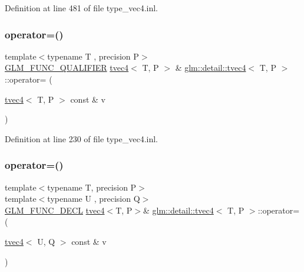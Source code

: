 Definition at line 481 of file type\+\_\+vec4.\+inl.

\mbox{\label{structglm_1_1detail_1_1tvec4_abafc0f4531b7d93b50e63bcdf9bcbf97}} 
\subsubsection{\texorpdfstring{operator=()}{operator=()}\hspace{0.1cm}{\footnotesize\ttfamily [1/3]}}
{\footnotesize\ttfamily template$<$typename T , precision P$>$ \\
\hyperlink{setup_8hpp_a33fdea6f91c5f834105f7415e2a64407}{G\+L\+M\+\_\+\+F\+U\+N\+C\+\_\+\+Q\+U\+A\+L\+I\+F\+I\+ER} \hyperlink{structglm_1_1detail_1_1tvec4}{tvec4}$<$ T, P $>$ \& \hyperlink{structglm_1_1detail_1_1tvec4}{glm\+::detail\+::tvec4}$<$ T, P $>$\+::operator= (\begin{DoxyParamCaption}\item[{\hyperlink{structglm_1_1detail_1_1tvec4}{tvec4}$<$ T, P $>$ const \&}]{v }\end{DoxyParamCaption})}



Definition at line 230 of file type\+\_\+vec4.\+inl.

\mbox{\label{structglm_1_1detail_1_1tvec4_a9fc0189acf6230da54693f07ff80d4e7}} 
\subsubsection{\texorpdfstring{operator=()}{operator=()}\hspace{0.1cm}{\footnotesize\ttfamily [2/3]}}
{\footnotesize\ttfamily template$<$typename T, precision P$>$ \\
template$<$typename U , precision Q$>$ \\
\hyperlink{setup_8hpp_ab2d052de21a70539923e9bcbf6e83a51}{G\+L\+M\+\_\+\+F\+U\+N\+C\+\_\+\+D\+E\+CL} \hyperlink{structglm_1_1detail_1_1tvec4}{tvec4}$<$T, P$>$\& \hyperlink{structglm_1_1detail_1_1tvec4}{glm\+::detail\+::tvec4}$<$ T, P $>$\+::operator= (\begin{DoxyParamCaption}\item[{\hyperlink{structglm_1_1detail_1_1tvec4}{tvec4}$<$ U, Q $>$ const \&}]{v }\end{DoxyParamCaption})}

